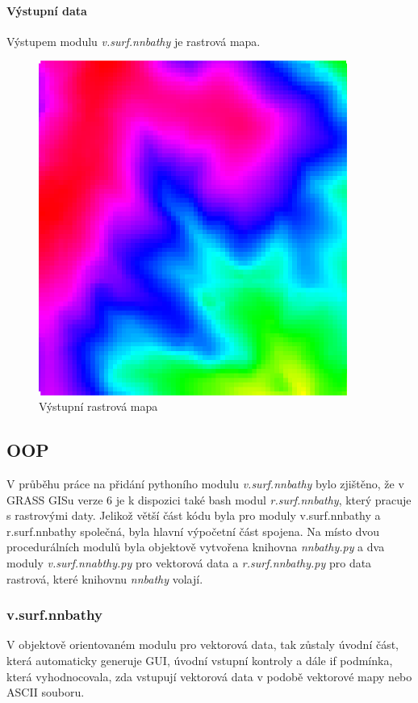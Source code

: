 \documentclass[12pt,a4paper]{article}
\begin{document}
\paragraph{Výstupní data}
Výstupem modulu \emph{v.surf.nnbathy} je rastrová mapa.
\begin{figure}[h!]
\centering
\includegraphics[width=0.9\textwidth]{img/vystup_rast_map.png}
\caption{Výstupní rastrová mapa}
\label{fig:vystup_rast_map}
\end{figure}

\newpage
\subsection{OOP}
V průběhu práce na přidání pythoního modulu \emph{v.surf.nnbathy} bylo zjištěno, že v GRASS GISu verze 6 je k dispozici také bash modul \emph{r.surf.nnbathy}, který pracuje s rastrovými daty. Jelikož větší část kódu byla pro moduly v.surf.nnbathy a r.surf.nnbathy společná, byla hlavní výpočetní část spojena. Na místo dvou procedurálních modulů byla objektově vytvořena knihovna \emph{nnbathy.py} a dva moduly \emph{v.surf.nnabthy.py} pro vektorová data a \emph{r.surf.nnbathy.py} pro data rastrová, které knihovnu \emph{nnbathy} volají.

\subsubsection{v.surf.nnbathy}
V objektově orientovaném modulu pro vektorová data, tak zůstaly úvodní část, která automaticky generuje GUI, úvodní vstupní kontroly a dále if podmínka, která vyhodnocovala, zda vstupují vektorová data v podobě vektorové mapy nebo ASCII souboru.
\end{document}
